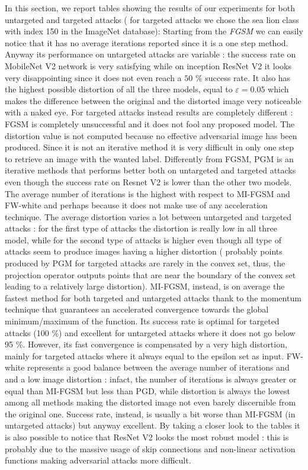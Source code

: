 \documentclass[10pt,twocolumn,letterpaper, english]{article}
\theoremstyle{definition}
\theoremstyle{plain}
\theoremstyle{plain}
\theoremstyle{plain}
\theoremstyle{plain}
\theoremstyle{remark}
\theoremstyle{remark}
\theoremstyle{definition}
\theoremstyle{definition}
\theoremstyle{definition}
\theoremstyle{definition}
\renewcommand{\epsilon}{\varepsilon}
\begin{document}
In this section, we report tables showing the results of our experiments for both untargeted and targeted attacks ( for targeted attacks we chose the sea lion class with index 150 in the ImageNet database):
Starting from the \textit{FGSM} we can easily notice that it has no average iterations reported since it is a one step method. Anyway its performance on untargeted attacks are variable : the success rate on MobileNet V2 network is very satisfying while on inception ResNet V2 it looks very disappointing since it does not even reach a $50$ \% success rate.
It also has the highest possible distortion of all the three models, equal to $\epsilon = 0.05$ which makes the difference between the original and the distorted image very noticeable with a naked eye.
For targeted attacks instead results are completely different : FGSM is completely unsuccessful and it does not fool any proposed model. The distortion value is not computed because no effective adversarial image has been produced. Since it is not an iterative method it is very difficult in only one step to retrieve an image with the wanted label.
Differently from FGSM, PGM is an iterative methods that performs better both on untargeted and targeted attacks even though the success rate on Resnet V2 is lower than the other two models. The average number of iterations is the highest with respect to MI-FGSM and FW-white and perhaps because it does not make use of any acceleration technique. The average distortion varies a lot between untargeted and targeted attacks : for the first type of attacks the distortion is really low in all three model, while for the second type of attacks is higher even though all type of attacks seem to produce images having a higher distortion ( probably points produced by PGM for targeted attacks are rarely in the convex set, thus, the projection operator outputs points that are near the boundary of the convex set leading to a relatively large distortion).
MI-FGSM, instead, is on average the fastest method for both targeted and untargeted attacks thank to the momentum technique that guarantees an  accelerated convergence towards the global minimum/maximum of the function. Its success rate is optimal for targeted attacks (100 \%) and excellent for untargeted attacks where it does not go below 95 \%. However, its fast convergence is compensated by a very high distortion, mainly for targeted attacks where it always equal to the epsilon set as input.
FW-white represents a good balance between the average number of iterations and and a low image distortion : infact, the number of iterations is always greater or equal than MI-FGSM but less than PGD, while distortion is always the lowest among all methods making the distorted image not even barely discernible from the original one. Success rate, instead, is usually a bit worse than MI-FGSM (in untargeted attacks) but anyway excellent.
By taking a closer look to the tables it is also possible to notice that ResNet V2 looks the most robust model : this is probably due to the massive usage of skip connections and non-linear activation functions making adversarial attacks more difficult.
\
\end{document}
